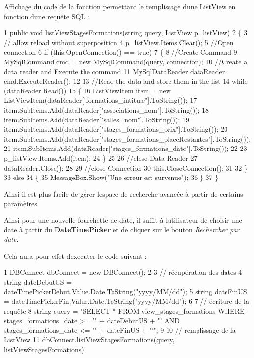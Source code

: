 Affichage du code de la fonction permettant le remplissage d\textquotesingle{}une List\+View en fonction d\textquotesingle{}une requête S\+QL \+: 
\begin{DoxyCode}
1 public void listViewStagesFormations(string query, ListView p\_listView)
2         \{
3             // allow reload without superposition
4             p\_listView.Items.Clear();
5             //Open connection
6             if (this.OpenConnection() == true)
7             \{
8                 //Create Command
9                 MySqlCommand cmd = new MySqlCommand(query, connection);
10                 //Create a data reader and Execute the command
11                 MySqlDataReader dataReader = cmd.ExecuteReader();
12 
13                 //Read the data and store them in the list
14                 while (dataReader.Read())
15                 \{
16                     ListViewItem item = new ListViewItem(dataReader["formations\_intitule"].ToString());
17                     item.SubItems.Add(dataReader["associations\_nom"].ToString());
18                     item.SubItems.Add(dataReader["salles\_nom"].ToString());
19                     item.SubItems.Add(dataReader["stages\_formations\_prix"].ToString());
20                     item.SubItems.Add(dataReader["stages\_formations\_placeRestantes"].ToString());
21                     item.SubItems.Add(dataReader["stages\_formations\_date"].ToString());
22 
23                     p\_listView.Items.Add(item);
24                 \}
25 
26                 //close Data Reader
27                 dataReader.Close();
28 
29                 //close Connection
30                 this.CloseConnection();
31 
32             \}
33             else
34             \{
35                 MessageBox.Show("Une erreur est survenue");
36             \}
37         \}
\end{DoxyCode}


Ainsi il est plus facile de gérer l\textquotesingle{}espace de recherche avancée à partir de certains paramètres



Ainsi pour une nouvelle fourchette de date, il suffit à l\textquotesingle{}utilisateur de choisir une date à partir du {\bfseries Date\+Time\+Picker} et de cliquer sur le bouton {\itshape Rechercher par date}.

Cela aura pour effet d\textquotesingle{}executer le code suivant \+:


\begin{DoxyCode}
1 DBConnect dbConnect = new DBConnect();
2 
3 // récupération des dates 
4 string dateDebutUS = dateTimePickerDebut.Value.Date.ToString("yyyy/MM/dd");
5 string dateFinUS = dateTimePickerFin.Value.Date.ToString("yyyy/MM/dd");
6 
7 // écriture de la requête
8 string query = "SELECT * FROM view\_stages\_formations WHERE stages\_formations\_date >= '" + dateDebutUS + "'
       AND stages\_formations\_date <= '" + dateFinUS + "'";
9 
10 // remplissage de la ListView
11 dbConnect.listViewStagesFormations(query, listViewStagesFormations);
\end{DoxyCode}
 